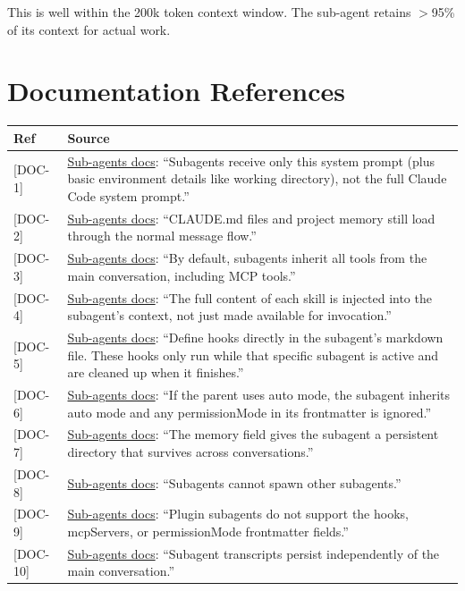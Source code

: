 \documentclass[a4paper,10pt]{article}
\newcommand{\coderef}[1]{\textsf{\small [#1]}}
\begin{document}
This is well within the 200k token context window. The sub-agent
retains $>$95\% of its context for actual work.

\section{Documentation References}
\label{sec:refs}

\begin{center}
\begin{tabularx}{\textwidth}{@{}lX@{}}
\toprule
\textbf{Ref} & \textbf{Source} \\
\midrule
\coderef{DOC-1} &
  \href{https://code.claude.com/docs/en/sub-agents}{Sub-agents docs}:
  ``Subagents receive only this system prompt (plus basic environment
  details like working directory), not the full Claude Code system
  prompt.'' \\
\coderef{DOC-2} &
  \href{https://code.claude.com/docs/en/sub-agents}{Sub-agents docs}:
  ``CLAUDE.md files and project memory still load through the normal
  message flow.'' \\
\coderef{DOC-3} &
  \href{https://code.claude.com/docs/en/sub-agents}{Sub-agents docs}:
  ``By default, subagents inherit all tools from the main
  conversation, including MCP tools.'' \\
\coderef{DOC-4} &
  \href{https://code.claude.com/docs/en/sub-agents}{Sub-agents docs}:
  ``The full content of each skill is injected into the subagent's
  context, not just made available for invocation.'' \\
\coderef{DOC-5} &
  \href{https://code.claude.com/docs/en/sub-agents}{Sub-agents docs}:
  ``Define hooks directly in the subagent's markdown file. These
  hooks only run while that specific subagent is active and are
  cleaned up when it finishes.'' \\
\coderef{DOC-6} &
  \href{https://code.claude.com/docs/en/sub-agents}{Sub-agents docs}:
  ``If the parent uses auto mode, the subagent inherits auto mode
  and any permissionMode in its frontmatter is ignored.'' \\
\coderef{DOC-7} &
  \href{https://code.claude.com/docs/en/sub-agents}{Sub-agents docs}:
  ``The memory field gives the subagent a persistent directory that
  survives across conversations.'' \\
\coderef{DOC-8} &
  \href{https://code.claude.com/docs/en/sub-agents}{Sub-agents docs}:
  ``Subagents cannot spawn other subagents.'' \\
\coderef{DOC-9} &
  \href{https://code.claude.com/docs/en/sub-agents}{Sub-agents docs}:
  ``Plugin subagents do not support the hooks, mcpServers, or
  permissionMode frontmatter fields.'' \\
\coderef{DOC-10} &
  \href{https://code.claude.com/docs/en/sub-agents}{Sub-agents docs}:
  ``Subagent transcripts persist independently of the main
  conversation.'' \\
\bottomrule
\end{tabularx}
\end{center}
\end{document}
